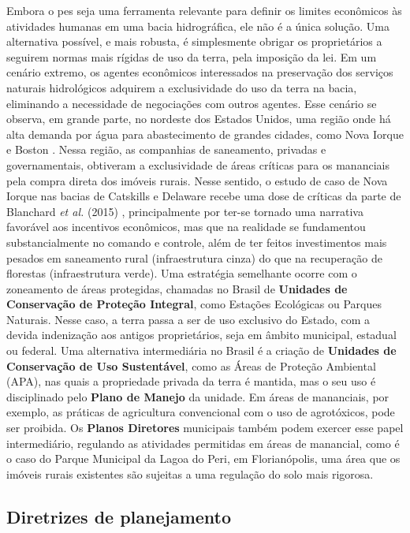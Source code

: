 \documentclass[./main.tex]{subfiles}
\begin{document}
\par Embora o \acrshort{pes} seja uma ferramenta relevante para definir os limites econômicos às atividades humanas em uma bacia hidrográfica, ele não é a única solução. Uma alternativa possível, e mais robusta, é simplesmente obrigar os proprietários a seguirem normas mais rígidas de uso da terra, pela imposição da lei. Em um cenário extremo, os agentes econômicos interessados na preservação dos serviços naturais hidrológicos adquirem a exclusividade do uso da terra na bacia, eliminando a necessidade de negociações com outros agentes. Esse cenário se observa, em grande parte, no nordeste dos Estados Unidos, uma região onde há alta demanda por água para abastecimento de grandes cidades, como Nova Iorque e Boston \cite{alcott2013}. Nessa região, as companhias de saneamento, privadas e governamentais, obtiveram a exclusividade de áreas críticas para os mananciais pela compra direta dos imóveis rurais. Nesse sentido, o estudo de caso de Nova Iorque nas bacias de Catskills e Delaware recebe uma dose de críticas da parte de Blanchard \textit{et al.} (2015) \cite{Blanchard2015a}, principalmente por ter-se tornado uma narrativa favorável aos incentivos econômicos, mas que na realidade se fundamentou substancialmente no comando e controle, além de ter feitos investimentos mais pesados em saneamento rural (infraestrutura cinza) do que na recuperação de florestas (infraestrutura verde). Uma estratégia semelhante ocorre com o zoneamento de áreas protegidas, chamadas no Brasil de \textbf{Unidades de Conservação de Proteção Integral}, como Estações Ecológicas ou Parques Naturais. Nesse caso, a terra passa a ser de uso exclusivo do Estado, com a devida indenização aos antigos proprietários, seja em âmbito municipal, estadual ou federal. Uma alternativa intermediária no Brasil é a criação de \textbf{Unidades de Conservação de Uso Sustentável}, como as Áreas de Proteção Ambiental (APA), nas quais a propriedade privada da terra é mantida, mas o seu uso é disciplinado pelo \textbf{Plano de Manejo} da unidade. Em áreas de mananciais, por exemplo, as práticas de agricultura convencional com o uso de agrotóxicos, pode ser proibida. Os \textbf{Planos Diretores} municipais também podem exercer esse papel intermediário, regulando as atividades permitidas em áreas de manancial, como é o caso do Parque Municipal da Lagoa do Peri, em Florianópolis, uma área que os imóveis rurais existentes são sujeitas a uma regulação do solo mais rigorosa.

\subsection{Diretrizes de planejamento}
\end{document}
